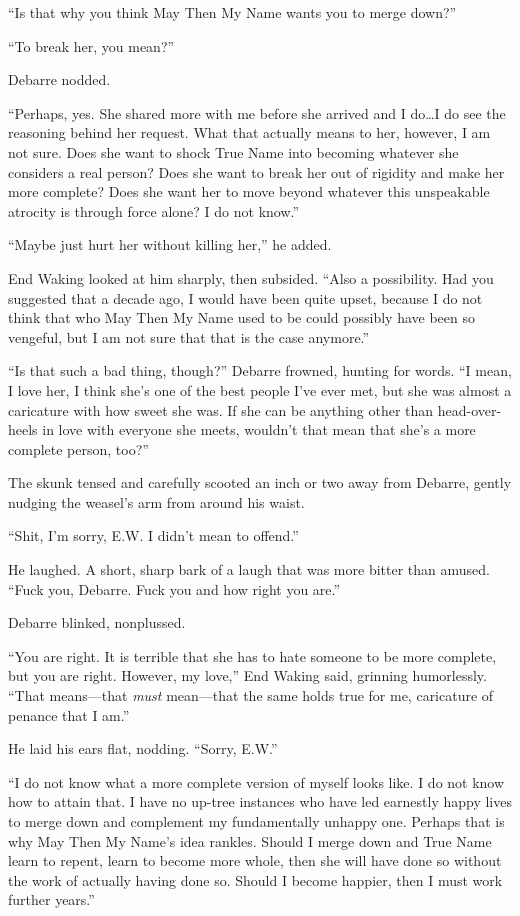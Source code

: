 ``Is that why you think May Then My Name wants you to merge down?''

``To break her, you mean?''

Debarre nodded.

``Perhaps, yes. She shared more with me before she arrived and I do\ldots I do see the reasoning behind her request. What that actually means to her, however, I am not sure. Does she want to shock True Name into becoming whatever she considers a real person? Does she want to break her out of rigidity and make her more complete? Does she want her to move beyond whatever this unspeakable atrocity is through force alone? I do not know.''

``Maybe just hurt her without killing her,'' he added.

End Waking looked at him sharply, then subsided. ``Also a possibility. Had you suggested that a decade ago, I would have been quite upset, because I do not think that who May Then My Name used to be could possibly have been so vengeful, but I am not sure that that is the case anymore.''

``Is that such a bad thing, though?'' Debarre frowned, hunting for words. ``I mean, I love her, I think she's one of the best people I've ever met, but she was almost a caricature with how sweet she was. If she can be anything other than head-over-heels in love with everyone she meets, wouldn't that mean that she's a more complete person, too?''

The skunk tensed and carefully scooted an inch or two away from Debarre, gently nudging the weasel's arm from around his waist.

``Shit, I'm sorry, E.W. I didn't mean to offend.''

He laughed. A short, sharp bark of a laugh that was more bitter than amused. ``Fuck you, Debarre. Fuck you and how right you are.''

Debarre blinked, nonplussed.

``You are right. It is terrible that she has to hate someone to be more complete, but you are right. However, my love,'' End Waking said, grinning humorlessly. ``That means—that \emph{must} mean—that the same holds true for me, caricature of penance that I am.''

He laid his ears flat, nodding. ``Sorry, E.W.''

``I do not know what a more complete version of myself looks like. I do not know how to attain that. I have no up-tree instances who have led earnestly happy lives to merge down and complement my fundamentally unhappy one. Perhaps that is why May Then My Name's idea rankles. Should I merge down and True Name learn to repent, learn to become more whole, then she will have done so without the work of actually having done so. Should I become happier, then I must work further years.''

